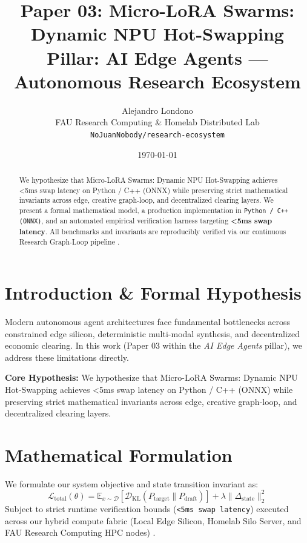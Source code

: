 \documentclass[10pt,twocolumn]{article}
\title{\textbf{Paper 03: Micro-LoRA Swarms: Dynamic NPU Hot-Swapping}\\
\large Pillar: AI Edge Agents --- Autonomous Research Ecosystem}
\author{
  Alejandro Londono \\
  FAU Research Computing \& Homelab Distributed Lab \\
  \texttt{NoJuanNobody/research-ecosystem}
}
\date{\today}
\begin{document}
\maketitle

\begin{abstract}
We hypothesize that Micro-LoRA Swarms: Dynamic NPU Hot-Swapping achieves <5ms swap latency on Python / C++ (ONNX) while preserving strict mathematical invariants across edge, creative graph-loop, and decentralized clearing layers.
We present a formal mathematical model, a production implementation in \texttt{Python / C++ (ONNX)}, and an automated empirical verification harness targeting \textbf{<5ms swap latency}. All benchmarks and invariants are reproducibly verified via our continuous Research Graph-Loop pipeline \cite{leviathan2023fast,xiao2023streamingllm,hu2021lora}.
\end{abstract}

\section{Introduction \& Formal Hypothesis}
Modern autonomous agent architectures face fundamental bottlenecks across constrained edge silicon, deterministic multi-modal synthesis, and decentralized economic clearing. In this work (Paper 03 within the \textit{AI Edge Agents} pillar), we address these limitations directly.

\textbf{Core Hypothesis:} We hypothesize that Micro-LoRA Swarms: Dynamic NPU Hot-Swapping achieves <5ms swap latency on Python / C++ (ONNX) while preserving strict mathematical invariants across edge, creative graph-loop, and decentralized clearing layers.

\section{Mathematical Formulation}
We formulate our system objective and state transition invariant as:
\begin{equation}
\mathcal{L}_{\text{total}}(\theta) = \mathbb{E}_{x \sim \mathcal{D}}\left[\mathcal{D}_{\text{KL}}(P_{\text{target}} \parallel P_{\text{draft}})\right] + \lambda \|\Delta_{\text{state}}\|_2^2
\end{equation}
Subject to strict runtime verification bounds (\texttt{<5ms swap latency}) executed across our hybrid compute fabric (Local Edge Silicon, Homelab Silo Server, and FAU Research Computing HPC nodes) \cite{rafailov2023dpo,shapley1953value,hanson2003combinatorial}.
\end{document}
